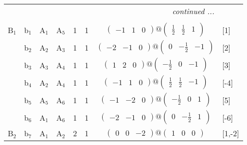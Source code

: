 \documentclass[fleqn,10pt,landscape]{article}
\begin{document}
\begin{itemize}
\begin{center}
\begin{longtable}{cc|cc|c|c|c|l}
 \hline \hline
\multicolumn{7}{r}{\footnotesize\it continued ...} \\ \endfoot

 \hline \hline
\multicolumn{7}{r}{} \\ \endlastfoot

B$_{1}$ & b$_{1}$ & A$_{1}$ & A$_{5}$ & 1 & 1 & $\begin{pmatrix} -1 & 1 & 0 \end{pmatrix}@\begin{pmatrix} \frac{1}{2} & \frac{1}{2} & 1 \end{pmatrix}$ & [1] \\
& b$_{2}$ & A$_{2}$ & A$_{3}$ & 1 & 1 & $\begin{pmatrix} -2 & -1 & 0 \end{pmatrix}@\begin{pmatrix} 0 & - \frac{1}{2} & -1 \end{pmatrix}$ & [2] \\
& b$_{3}$ & A$_{3}$ & A$_{4}$ & 1 & 1 & $\begin{pmatrix} 1 & 2 & 0 \end{pmatrix}@\begin{pmatrix} - \frac{1}{2} & 0 & -1 \end{pmatrix}$ & [3] \\
& b$_{4}$ & A$_{2}$ & A$_{4}$ & 1 & 1 & $\begin{pmatrix} -1 & 1 & 0 \end{pmatrix}@\begin{pmatrix} \frac{1}{2} & \frac{1}{2} & -1 \end{pmatrix}$ & [-4] \\
& b$_{5}$ & A$_{5}$ & A$_{6}$ & 1 & 1 & $\begin{pmatrix} -1 & -2 & 0 \end{pmatrix}@\begin{pmatrix} - \frac{1}{2} & 0 & 1 \end{pmatrix}$ & [5] \\
& b$_{6}$ & A$_{1}$ & A$_{6}$ & 1 & 1 & $\begin{pmatrix} -2 & -1 & 0 \end{pmatrix}@\begin{pmatrix} 0 & - \frac{1}{2} & 1 \end{pmatrix}$ & [-6] \\ \hline
B$_{2}$ & b$_{7}$ & A$_{1}$ & A$_{2}$ & 2 & 1 & $\begin{pmatrix} 0 & 0 & -2 \end{pmatrix}@\begin{pmatrix} 1 & 0 & 0 \end{pmatrix}$ & [1,-2] \\

\end{longtable}
\end{center}
\end{itemize}
\end{document}
